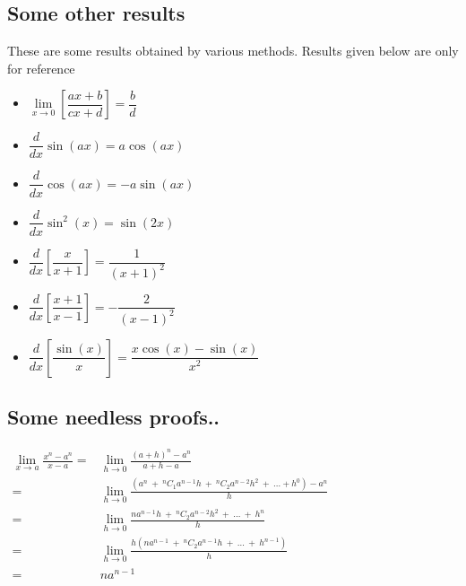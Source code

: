 \documentclass{article}
\begin{document}
\subsection{Some other results}
\par These are some results obtained by various methods. Results given below are only for reference
\begin{itemize}
  \item $\lim\limits_{x \to 0}\left[\dfrac{ax + b}{cx + d}\right] = \dfrac{b}{d}$
  \item $\dfrac{d}{dx}\sin(ax) = a\cos(ax)$
  \item $\dfrac{d}{dx}\cos(ax) = -a\sin(ax)$
  \item $\dfrac{d}{dx}\sin^2(x) = \sin(2x)$
  \item $\dfrac{d}{dx}\left[\dfrac{x}{x+1}\right] = \dfrac{1}{(x+1)^2}$
  \item $\dfrac{d}{dx}\left[\dfrac{x+1}{x-1}\right] = -\dfrac{2}{(x-1)^2}$
  \item $\dfrac{d}{dx}\left[\dfrac{\sin(x)}{x}\right] = \dfrac{x\cos(x) - \sin(x)}{x^2}$
\end{itemize}

\subsection{Some needless proofs..}

\begin{math}
\begin{aligned}
\lim\limits_{x \to a} \frac{x^{n}-a^{n}}{x-a}
=& \lim\limits_{h \to 0} \frac{(a + h)^n - a^n}{a+h-a} \\
=& \lim\limits_{h \to 0} \frac{\left(a^n\ +\ {}^{n}C_1 a^{n-1} h\ +\ { }^{n}C_2 a^{n-2} h^2\ +\ \ldots + h^0\right)-a^{n}}{h} \\
=& \lim\limits_{h \to 0} \frac{n a^{n-1} h\ +\ {}^{n}C_2 a^{n-2} h^2\ +\ \ldots\ +\ h^{n}}{h} \\
=& \lim\limits_{h \to 0} \frac{h\left(na^{n-1}\ +\ {}^{n}C_2 a^{n-1} h\ +\ \ldots\ +\ h^{n-1}\right)}{h} \\
=& na^{n-1}\\
\end{aligned}
\end{math}
\end{document}
